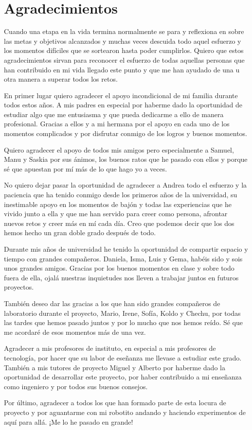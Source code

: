\chapter{Agradecimientos}

Cuando una etapa en la vida termina normalmente se para y reflexiona en sobre las metas y objetivos alcanzados y muchas veces descuida todo aquel esfuerzo y los momentos difíciles que se sortearon hasta poder cumplirlos. Quiero que estos agradecimientos sirvan para reconocer el esfuerzo de todas aquellas personas que han contribuido en mi vida llegado este punto y que me han ayudado de una u otra manera a superar todos los retos.

En primer lugar quiero agradecer el apoyo incondicional de mi familia durante todos estos años. A mis padres en especial por haberme dado la oportunidad de estudiar algo que me entusiasma y que pueda dedicarme a ello de manera profesional. Gracias a ellos y a mi hermana por el apoyo en cada uno de los momentos complicados y por disfrutar conmigo de los logros y buenos momentos.

Quiero agradecer el apoyo de todos mis amigos pero especialmente a Samuel, Manu y Saskia por sus ánimos, los buenos ratos que he pasado con ellos y porque sé que apuestan por mí más de lo que hago yo a veces.

No quiero dejar pasar la oportunidad de agradecer a Andrea todo el esfuerzo y la paciencia que ha tenido conmigo desde los primeros años de la universidad, su inestimable apoyo en los momentos de bajón y todas las experiencias que he vivido junto a ella y que me han servido para creer como persona, afrontar nuevos retos y creer más en mí cada día. Creo que podemos decir que los dos hemos hecho un gran doble grado después de todo.

Durante mis años de universidad he tenido la oportunidad de compartir espacio y tiempo con grandes compañeros. Daniela, Isma, Luis y Gema, habéis sido y sois unos grandes amigos. Gracias por los buenos momentos en clase y sobre todo fuera de ella, ojalá nuestras inquietudes nos lleven a trabajar juntos en futuros proyectos.

También deseo dar las gracias a los que han sido grandes compañeros de laboratorio durante el proyecto, Mario, Irene, Sofía, Koldo y Chechu, por todas las tardes que hemos pasado juntos y por lo mucho que nos hemos reído. Sé que me acordaré de esos momentos más de una vez.

Agradecer a mis profesores de instituto, en especial a mis profesores de tecnología, por hacer que su labor de eseñanza me llevase a estudiar este grado. También a mis tutores de proyecto Miguel y Alberto por haberme dado la oportunidad de desarrollar este proyecto, por haber contribuido a mi enseñanza como ingeniero y por todos sus buenos consejos.

Por último, agradecer a todos los que han formado parte de esta locura de proyecto y por aguantarme con mi robotito andando y haciendo experimentos de aquí para allá. ¡Me lo he pasado en grande!